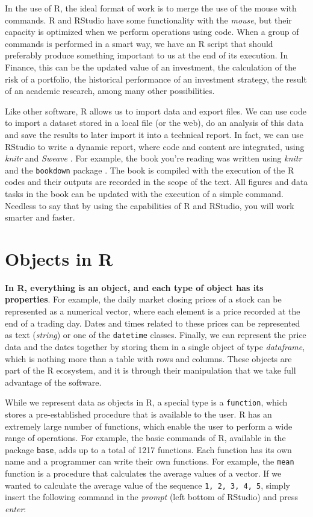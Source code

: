 \documentclass[11pt,]{book}
\begin{document}
In the use of R, the ideal format of work is to merge the use of the
mouse with commands. R and RStudio have some functionality with the
\emph{mouse}, but their capacity is optimized when we perform operations
using code. When a group of commands is performed in a smart way, we
have an R script that should preferably produce something important to
us at the end of its execution. In Finance, this can be the updated
value of an investment, the calculation of the risk of a portfolio, the
historical performance of an investment strategy, the result of an
academic research, among many other possibilities.

Like other software, R allows us to import data and export files. We can
use code to import a dataset stored in a local file (or the web), do an
analysis of this data and save the results to later import it into a
technical report. In fact, we can use RStudio to write a dynamic report,
where code and content are integrated, using \emph{knitr} and
\emph{Sweave} \citep{leisch2002sweave}. For example, the book you're
reading was written using \emph{knitr} and the \texttt{bookdown} package
\citep{xie2016bookdown}. The book is compiled with the execution of the
R codes and their outputs are recorded in the scope of the text. All
figures and data tasks in the book can be updated with the execution of
a simple command. Needless to say that by using the capabilities of R
and RStudio, you will work smarter and faster. 

\section{Objects in R}\label{objects-in-r}

\textbf{In R, everything is an object, and each type of object has its
properties}. For example, the daily market closing prices of a stock can
be represented as a numerical vector, where each element is a price
recorded at the end of a trading day. Dates and times related to these
prices can be represented as text (\emph{string}) or one of the
\texttt{datetime} classes. Finally, we can represent the price data and
the dates together by storing them in a single object of type
\emph{dataframe}, which is nothing more than a table with rows and
columns. These objects are part of the R ecosystem, and it is through
their manipulation that we take full advantage of the software.

While we represent data as objects in R, a special type is a
\texttt{function}, which stores a pre-established procedure that is
available to the user. R has an extremely large number of functions,
which enable the user to perform a wide range of operations. For
example, the basic commands of R, available in the package
\texttt{base}, adds up to a total of 1217 functions. Each function has
its own name and a programmer can write their own functions. For
example, the \texttt{mean} function is a procedure that calculates the
average values of a vector. If we wanted to calculate the average value
of the sequence \texttt{1,\ 2,\ 3,\ 4,\ 5}, simply insert the following
command in the \emph{prompt} (left bottom of RStudio) and press
\emph{enter}:  
\end{document}
